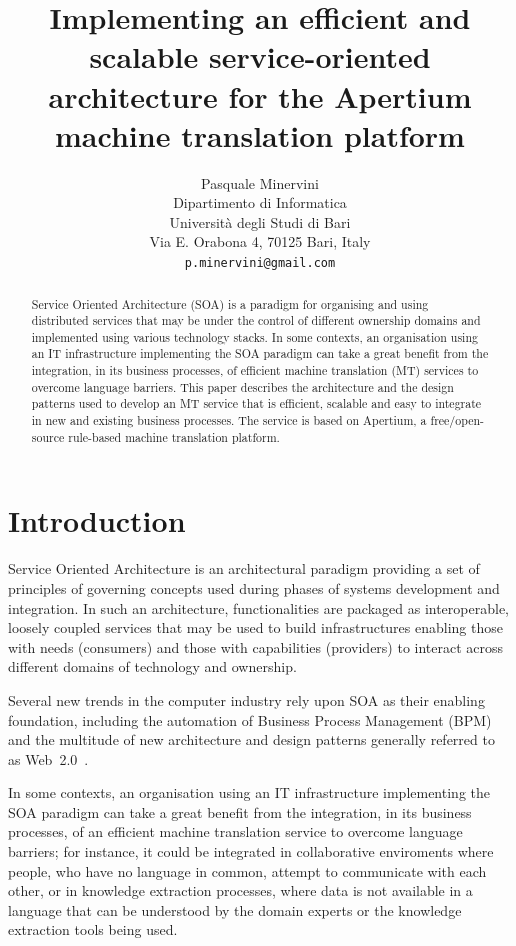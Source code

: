 \documentclass[11pt]{article}
\title{Implementing an efficient and scalable service-oriented architecture for the Apertium machine translation platform}
\author{Pasquale Minervini\\
  Dipartimento di Informatica\\
  Università degli Studi di Bari\\
  Via E. Orabona 4, 70125 Bari, Italy\\
  {\tt p.minervini@gmail.com}}
\date{}
\begin{document}
\maketitle

\begin{abstract}
Service Oriented Architecture (SOA) is a paradigm for organising and using 
distributed services that may be under the control of different ownership 
domains and implemented using various technology stacks. In some contexts, 
an organisation using an IT infrastructure implementing the SOA paradigm 
can take a great benefit from the integration, in its business processes, 
of efficient machine translation (MT) services to overcome language barriers. This 
paper describes the architecture and the design patterns used to develop an MT
service that is efficient, scalable and easy to integrate in new and existing 
business processes. The service is based on Apertium, a free/open-source 
rule-based machine translation platform.
\end{abstract}


\section{Introduction}

Service Oriented Architecture is an architectural paradigm providing a set of 
principles of governing concepts used during phases of systems development and 
integration. In such an architecture, functionalities are packaged as 
interoperable, loosely coupled services that may be used to build infrastructures 
enabling those with needs (consumers) and those with capabilities (providers) 
to interact across different domains of technology and ownership.

Several new trends in the computer industry rely upon SOA as their enabling 
foundation, including the automation of Business Process Management (BPM) and 
the multitude of new architecture and design patterns generally referred to as 
Web~2.0~\citep{web20}.

In some contexts, an organisation using an IT infrastructure implementing 
the SOA paradigm can take a great benefit from the integration, in its business 
processes, of an efficient machine translation service to overcome language 
barriers; for instance, it could be integrated in collaborative enviroments 
where people, who have no language in common, attempt to communicate with each 
other, or in knowledge extraction processes, where data is not available in a 
language that can be understood by the domain experts or the knowledge 
extraction tools being used.
\end{document}
